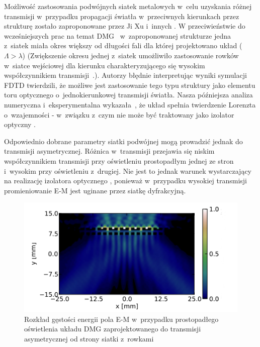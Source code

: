 Możliwość zastosowania podwójnych siatek metalowych w~celu uzyskania różnej transmisji w~przypadku propagacji światła w~przeciwnych kierunkach przez strukturę zostało zaproponowane przez Ji Xu i~innych \cite{xu2011unidirectional}. W przeciwieństwie do wcześniejszych prac na temat DMG~\cite{cheng2007controllable,cheng2008physical,chan2006optical} w~zaproponowanej strukturze jedna z~siatek miała okres większy od długości fali dla której projektowano układ ($\Lambda>\lambda$) (Zwiększenie okresu jednej z~siatek umożliwiło zastosowanie rowków w~siatce wejściowej dla kierunku charakteryzującego się wysokim współczynnikiem transmisji~\cite{xu2011unidirectional}.). Autorzy błędnie interpretując wyniki symulacji FDTD twierdzili, że możliwe jest zastosowanie tego typu struktury jako elementu toru optycznego o~jednokierunkowej transmisji światła. Nasza późniejsza analiza numeryczna i~eksperymentalna wykazała~\cite{Stolarek:13}, że układ spełnia twierdzenie Lorenzta o~wzajemności - w~związku z~czym nie może być  traktowany jako izolator optyczny \cite{jalas2013and}. 

Odpowiednio dobrane parametry siatki podwójnej mogą prowadzić jednak do transmisji asymetrycznej. Różnica w~transmisji przejawia się niskim współczynnikiem transmisji przy oświetleniu prostopadłym jednej ze stron i~wysokim przy oświetleniu z~drugiej. Nie jest to jednak warunek wystarczający na realizację izolatora optycznego \cite{jalas2013and}, ponieważ w~przypadku wysokiej transmisji promieniowanie E-M jest uginane przez siatkę dyfrakcyjną. 

\begin{figure}[tb]
	\includegraphics[width=\textwidth]{images/thz/opt_lett_gora.png}
	\caption{Rozkład gęstości energii pola E-M w~przypadku prostopadłego oświetlenia układu DMG zaprojektowanego do transmisji asymetrycznej od strony siatki z~rowkami~\cite{Stolarek:13}}
	\label{fig:trans_gora}
\end{figure}

